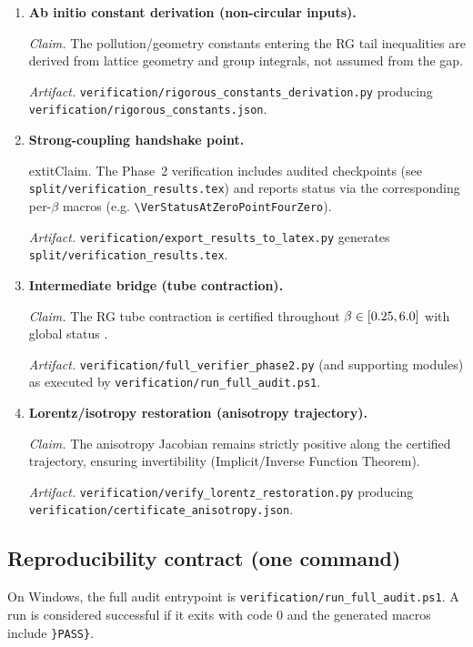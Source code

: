 \begin{enumerate}
    \item \textbf{Ab initio constant derivation (non-circular inputs).}
    
    \textit{Claim.} The pollution/geometry constants entering the RG tail inequalities are derived from lattice geometry and group integrals, not assumed from the gap.

    \textit{Artifact.} \texttt{verification/rigorous\_constants\_derivation.py} producing \texttt{verification/rigorous\_constants.json}.

    \item \textbf{Strong-coupling handshake point.}

    	extit{Claim.} The Phase~2 verification includes audited checkpoints (see \texttt{split/verification\_results.tex}) and reports status via the corresponding per-$\beta$ macros (e.g. \texttt{\textbackslash VerStatusAtZeroPointFourZero}).

    \textit{Artifact.} \texttt{verification/export\_results\_to\_latex.py} generates \texttt{split/verification\_results.tex}.

    \item \textbf{Intermediate bridge (tube contraction).}

    \textit{Claim.} The RG tube contraction is certified throughout $\beta \in [0.25,6.0]$ with global status \textbf{\VerStatus}.

    \textit{Artifact.} \texttt{verification/full\_verifier\_phase2.py} (and supporting modules) as executed by \texttt{verification/run\_full\_audit.ps1}.

    \item \textbf{Lorentz/isotropy restoration (anisotropy trajectory).}

    \textit{Claim.} The anisotropy Jacobian remains strictly positive along the certified trajectory, ensuring invertibility (Implicit/Inverse Function Theorem).

    \textit{Artifact.} \texttt{verification/verify\_lorentz\_restoration.py} producing \texttt{verification/certificate\_anisotropy.json}.
\end{enumerate}

\subsection{Reproducibility contract (one command)}

On Windows, the full audit entrypoint is \texttt{verification/run\_full\_audit.ps1}. A run is considered successful if it exits with code 0 and the generated macros include \texttt{\string\newcommand\{\string\VerStatus\}\{PASS\}}.

